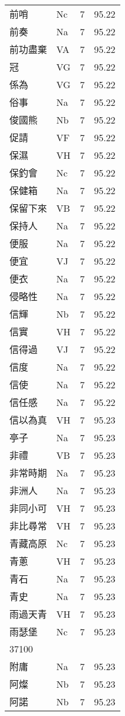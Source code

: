 \documentclass[twocolumn]{book}
\begin{document}
\begin{supertabular}{llrr}
前哨 & Nc & 7 &  95.22\\
前奏 & Na & 7 &  95.22\\
前功盡棄 & VA & 7 &  95.22\\
冠 & VG & 7 &  95.22\\
係為 & VG & 7 &  95.22\\
俗事 & Na & 7 &  95.22\\
俊國熊 & Nb & 7 &  95.22\\
促請 & VF & 7 &  95.22\\
保濕 & VH & 7 &  95.22\\
保釣會 & Nc & 7 &  95.22\\
保健箱 & Na & 7 &  95.22\\
保留下來 & VB & 7 &  95.22\\
保持人 & Na & 7 &  95.22\\
便服 & Na & 7 &  95.22\\
便宜 & VJ & 7 &  95.22\\
便衣 & Na & 7 &  95.22\\
侵略性 & Na & 7 &  95.22\\
信輝 & Nb & 7 &  95.22\\
信實 & VH & 7 &  95.22\\
信得過 & VJ & 7 &  95.22\\
信度 & Na & 7 &  95.22\\
信使 & Na & 7 &  95.22\\
信任感 & Na & 7 &  95.22\\
信以為真 & VH & 7 &  95.23\\
亭子 & Na & 7 &  95.23\\
非禮 & VB & 7 &  95.23\\
非常時期 & Na & 7 &  95.23\\
非洲人 & Na & 7 &  95.23\\
非同小可 & VH & 7 &  95.23\\
非比尋常 & VH & 7 &  95.23\\
青藏高原 & Nc & 7 &  95.23\\
青蔥 & VH & 7 &  95.23\\
青石 & Na & 7 &  95.23\\
青史 & Na & 7 &  95.23\\
雨過天青 & VH & 7 &  95.23\\
雨瑟堡 & Nc & 7 &  95.23\\
37100\\
附庸 & Na & 7 &  95.23\\
阿燦 & Nb & 7 &  95.23\\
阿諾 & Nb & 7 &  95.23\\

\end{supertabular}
\end{document}
